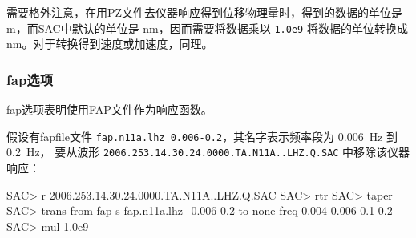 需要格外注意，在用PZ文件去仪器响应得到位移物理量时，得到的数据的单位是
\si{m}，而SAC中默认的单位是 \si{nm}，因而需要将数据乘以 \texttt{1.0e9}
将数据的单位转换成 \si{nm}。对于转换得到速度或加速度，同理。

\subsubsection{fap选项}
fap选项表明使用FAP文件作为响应函数。

假设有fapfile文件 \verb|fap.n11a.lhz_0.006-0.2|，其名字表示频率段为
\SI{0.006}{\Hz} 到 \SI{0.2}{\Hz}，
要从波形 \texttt{2006.253.14.30.24.0000.TA.N11A..LHZ.Q.SAC} 中移除该仪器响应：
\begin{SACCode}
SAC> r 2006.253.14.30.24.0000.TA.N11A..LHZ.Q.SAC
SAC> rtr
SAC> taper
SAC> trans from fap s fap.n11a.lhz_0.006-0.2 to none freq 0.004 0.006 0.1 0.2
SAC> mul 1.0e9
\end{SACCode}
